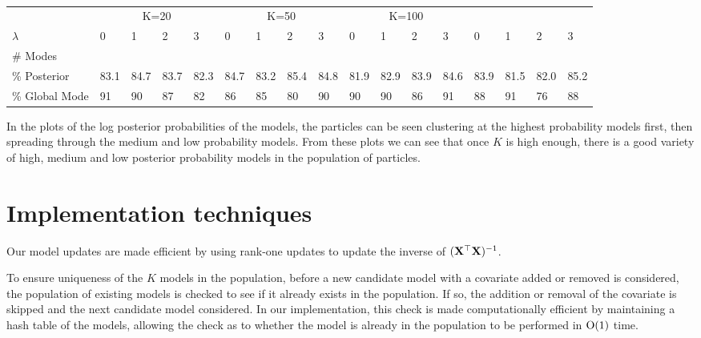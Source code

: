 \documentclass{amsart}[12pt]
\begin{document}
\begin{table}
	\caption{}
	\label{tab:result2}
	\begin{tabular}{l|llll|llll|llll|llll}
	\hline
	 					& \multicolumn{4}{c}{K=20} 	& \multicolumn{4}{c}{K=50} & \multicolumn{4}{c}{K=100} \\
	$\lambda$ & 0 & 1 & 2 & 3 & 0 & 1 & 2 & 3 & 0 & 1 & 2 & 3 & 0 & 1 & 2 & 3 \\
	\hline
	\# Modes & \\
	\% Posterior & 83.1 & 84.7 & 83.7 & 82.3 & 84.7 & 83.2 & 85.4 & 84.8 & 81.9 & 82.9 & 83.9 & 84.6 & 83.9 & 81.5 & 82.0 & 85.2 \\
	\% Global Mode & 91 & 90 & 87 & 82 & 86 & 85 & 80 & 90 & 90 & 90 & 86 & 91 & 88 & 91 & 76 & 88 \\
	\hline
	\end{tabular}

\end{table}

In the plots of the log posterior probabilities of the models, the particles can be seen clustering at the
highest probability models first, then spreading through the medium and low probability models. From these
plots we can see that once $K$ is high enough, there is a good variety of high, medium and low posterior
probability models in the population of particles.

\section{Implementation techniques}
Our model updates are made efficient by using rank-one updates to update the inverse of $({\bf X}^\top {\bf X})^{-1}$.

To ensure uniqueness of the $K$ models in the population, before a new candidate model with a covariate added
or removed is considered, the population of existing models is checked to see if it already exists in the
population. If so, the addition or removal of the covariate is skipped and the next candidate model considered.
In our implementation, this check is made computationally efficient by maintaining a hash table of the models,
allowing the check as to whether the model is already in the population to be performed in $\text{O}(1)$ time.



\end{document}
